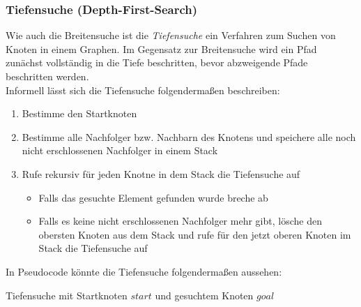             \subsubsection{Tiefensuche (Depth-First-Search)}
            Wie auch die Breitensuche ist die \emph{Tiefensuche} ein Verfahren zum Suchen von Knoten in einem Graphen. Im Gegensatz zur Breitensuche wird ein Pfad zunächst vollständig in die Tiefe beschritten, bevor abzweigende Pfade beschritten werden.\\
            Informell lässt sich die Tiefensuche folgendermaßen
            beschreiben:
            \begin{enumerate}
            \item Bestimme den Startknoten
            \item Bestimme alle Nachfolger bzw. Nachbarn des Knotens
              und speichere alle noch nicht erschlossenen Nachfolger
              in einem Stack
            \item Rufe rekursiv für jeden Knotne in dem Stack die
              Tiefensuche auf
              \begin{itemize}
              \item Falls das gesuchte Element gefunden wurde breche
                ab
              \item Falls es keine nicht erschlossenen Nachfolger mehr
                gibt, lösche den obersten Knoten aus dem Stack und
                rufe für den jetzt oberen Knoten im Stack die
                Tiefensuche auf
              \end{itemize}
            \end{enumerate}

            In Pseudocode könnte die Tiefensuche folgendermaßen
            aussehen:
            \begin{algorithm}[H]
              \caption{Tiefensuche mit Startknoten $start$ und
                gesuchtem Knoten $goal$}
              \begin{algorithmic}
		   \EndIf
                 \EndWhile
                \EndProcedure
              \end{algorithmic}
            \end{algorithm}

